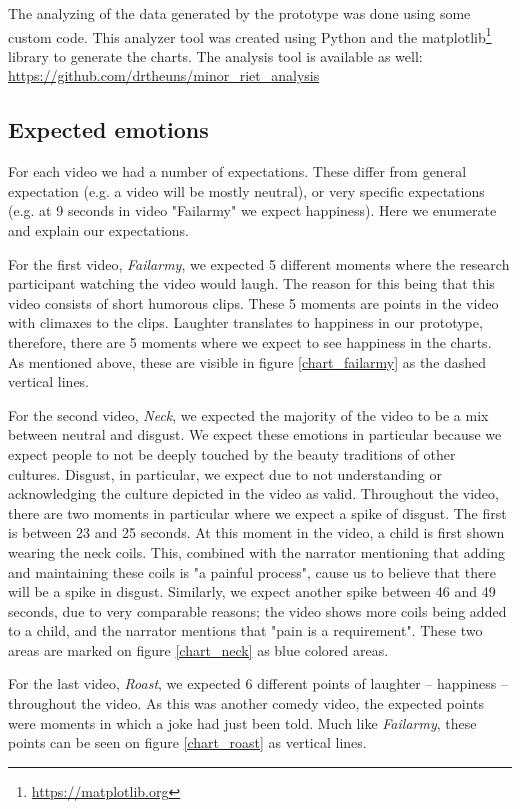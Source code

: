 \documentclass[sigconf]{acmart}
\begin{document}
The analyzing of the data generated by the prototype was done using some custom code. This analyzer tool was
created using Python and the matplotlib\footnote{\url{https://matplotlib.org}} library to generate the charts.
The analysis tool is available as well: \url{https://github.com/drtheuns/minor_riet_analysis}

\subsection{Expected emotions}
For each video we had a number of expectations. These differ from general expectation (e.g. a video will be
mostly neutral), or very specific expectations (e.g. at 9 seconds in video "Failarmy" we expect happiness).
Here we enumerate and explain our expectations.

For the first video, \emph{Failarmy}, we expected 5 different moments where the research participant watching
the video would laugh. The reason for this being that this video consists of short humorous clips. These 5
moments are points in the video with climaxes to the clips. Laughter translates to happiness in our prototype,
therefore, there are 5 moments where we expect to see happiness in the charts. As mentioned above,
these are visible in figure \ref{chart_failarmy} as the dashed vertical lines.

For the second video, \emph{Neck}, we expected the majority of the video to be a mix between neutral and disgust.
We expect these emotions in particular because we expect people to not be deeply touched by the beauty
traditions of other cultures. Disgust, in particular, we expect due to not understanding or acknowledging the
culture depicted in the video as valid. Throughout the video, there are two moments in particular where we
expect a spike of disgust. The first is between 23 and 25 seconds. At this moment in the video, a child is first
shown wearing the neck coils. This, combined with the narrator mentioning that adding and maintaining these coils
is "a painful process", cause us to believe that there will be a spike in disgust. Similarly, we expect another
spike between 46 and 49 seconds, due to very comparable reasons; the video shows more coils being added to a
child, and the narrator mentions that "pain is a requirement". These two areas are marked on figure
\ref{chart_neck} as blue colored areas.

For the last video, \emph{Roast}, we expected 6 different points of laughter -- happiness -- throughout
the video. As this was another comedy video, the expected points were moments in which a joke had just been told.
Much like \emph{Failarmy}, these points can be seen on figure \ref{chart_roast} as vertical lines.
\end{document}
